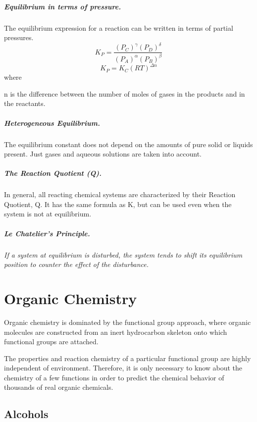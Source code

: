 \documentclass[oneside]{book} %
\theoremstyle{plain}
\begin{document}
\paragraph{Equilibrium in terms of pressure.} The equilibrium expression for a
reaction can be written in terms of partial pressures.
\[K_P = \frac{\left(P_C\right)^\gamma
\left(P_D\right)^\delta}{\left(P_A\right)^\alpha \left(P_B\right)^\beta}\]
\[K_P = K_C (RT)^{\Delta n}\]
where

n is the difference between the number of moles of gases in the products and in
the reactants.

\paragraph{Heterogeneous Equilibrium.} The equilibrium constant does not depend
on the amounts of pure solid
or liquids present. Just gases and aqueous solutions are taken into account.

\paragraph{The Reaction Quotient (Q).} In general, all reacting chemical
systems are characterized by their Reaction Quotient, Q. It has the same
formula as K, but can be used even when the system is not at equilibrium.

\paragraph{Le Chatelier's Principle.} \textit{If a system at equilibrium is
disturbed, the system tends to shift its equilibrium position to counter the
effect of the disturbance.}

\chapter{Organic Chemistry}
Organic chemistry is dominated by the functional group approach, where organic
molecules are constructed from an inert hydrocarbon skeleton onto which
functional groups are attached.

The properties and reaction chemistry of a particular functional group are
highly independent of environment. Therefore, it is only necessary to know about
the chemistry of a few functions in order to predict the chemical behavior of
thousands of real organic chemicals.

\section{Alcohols}
\end{document}

